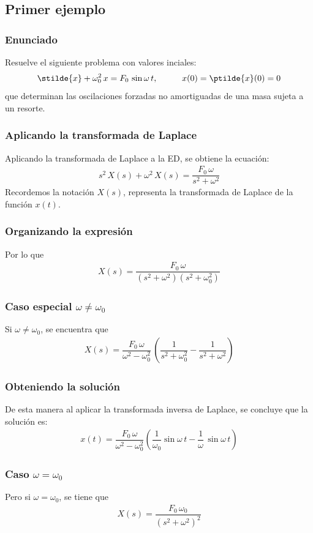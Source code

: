 \subsection{Primer ejemplo}
\begin{frame}
\frametitle{Enunciado}
Resuelve el siguiente problema con valores inciales:
\begin{align*}
\stilde{x} + \omega_{0}^{2} \, x = F_{0} \, \sin \omega \, t, \hspace{1cm} x(0) = \ptilde{x} (0) = 0
\end{align*}
que determinan las oscilaciones forzadas no amortiguadas de una masa sujeta a un resorte.
\end{frame}
\begin{frame}
\frametitle{Aplicando la transformada de Laplace}
Aplicando la transformada de Laplace a la ED, se obtiene la ecuación:
\begin{align*}
s^{2} \, X(s) + \omega^{2} \, X(s) = \dfrac{F_{0} \, \omega}{s^{2} + \omega^{2}}
\end{align*}
\pause
Recordemos la notación $X(s)$, representa la transformada de Laplace de la función $x(t)$.
\end{frame}
\begin{frame}
\frametitle{Organizando la expresión}
Por lo que
\begin{align*}
X(s) = \dfrac{F_{0} \, \omega}{(s^{2} + \omega^{2})(s^{2} + \omega_{0}^{2})}
\end{align*}
\end{frame}
\begin{frame}
\frametitle{Caso especial $\omega \neq \omega_{0}$}
Si $\omega \neq \omega_{0}$, se encuentra que
\begin{align*}
X(s) = \dfrac{F_{0} \, \omega}{\omega^{2} - \omega_{0}^{2}} \, \left( \dfrac{1}{s^{2}+ \omega_{0}^{2}} - \dfrac{1}{s^{2} + \omega^{2}} \right)
\end{align*}
\end{frame}
\begin{frame}
\frametitle{Obteniendo la solución}
De esta manera al aplicar la transformada inversa de Laplace, se concluye que la solución es:
\begin{align*}
x(t) = \dfrac{F_{0} \, \omega}{\omega^{2} - \omega_{0}^{2}} \left( \dfrac{1}{\omega_{0}} \sin \omega \, t - \dfrac{1}{\omega} \, \sin \omega \, t \right)
\end{align*}
\end{frame}
\begin{frame}
\frametitle{Caso $\omega = \omega_{0}$}
Pero si $\omega = \omega_{0}$, se tiene que
\begin{align*}
X(s) = \dfrac{F_{0} \, \omega_{0}}{(s^{2} + \omega^{2})^{2}}
\end{align*}
\end{frame}
